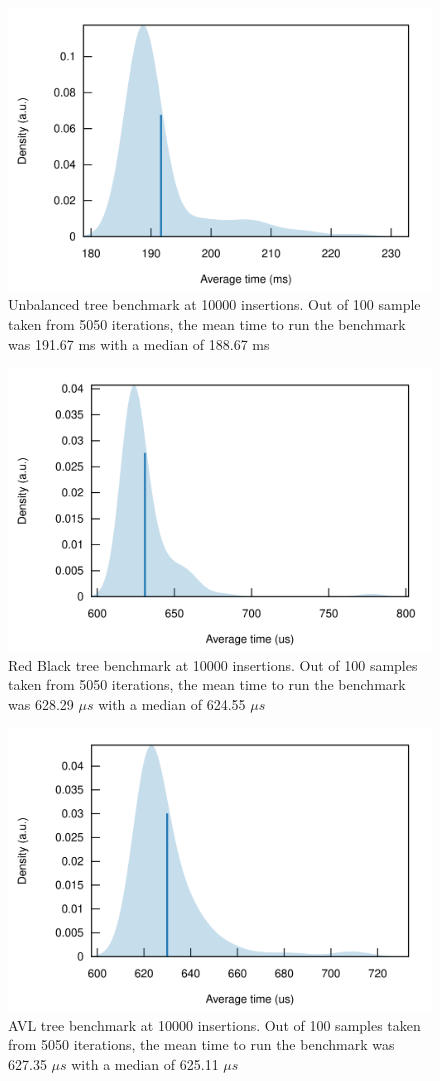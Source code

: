 \documentclass[letterpaper]{article}
\begin{document}
\begin{figure}[H]
	\centering
	\includegraphics[width=.8\textwidth]{bsbench.png}
	\caption{Unbalanced tree benchmark at 10000 insertions. Out of 100 sample
		taken from 5050 iterations, the mean time to run the benchmark was
		191.67 ms with a median of 188.67 ms}
\end{figure}

\begin{figure}[H]
	\centering
	\includegraphics[width=.8\textwidth]{rbsmol.png}
	\caption{Red Black tree benchmark at 10000 insertions. Out of 100 samples
		taken from 5050 iterations, the mean time to run the benchmark was 628.29
		$\mu s$ with a median of 624.55 $\mu s$}
\end{figure}

\begin{figure}[H]
	\centering
	\includegraphics[width=.8\textwidth]{avlsmol.png}
	\caption{AVL tree benchmark at 10000 insertions. Out of 100 samples taken
		from 5050 iterations,
		the mean time to run the benchmark was 627.35 $\mu s$ with a median of
		625.11 $\mu s$}
\end{figure}
\end{document}
